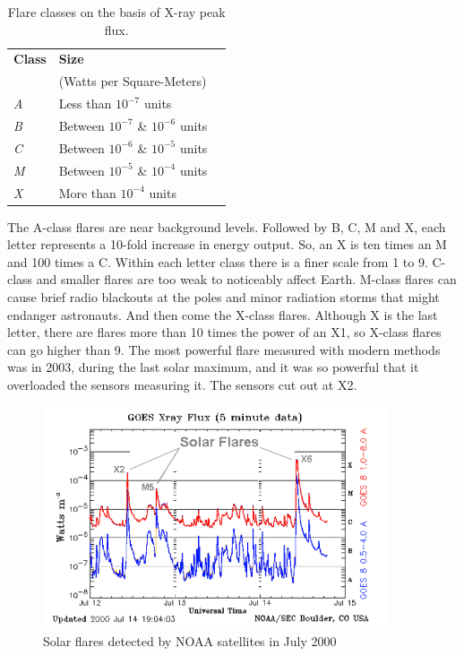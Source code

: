 \documentclass[12pt,twoside]{reedthesis}
\begin{document}
\begin{table}[h]
	\centering 
	\begin{tabular}{lp{5cm}l}
		\hline
		\textbf{Class} &  \textbf{Size} \\ & (Watts per Square-Meters) \\
		\hline
		\textit{A}  		&  Less  than  $10^{-7}$ units \\
		\textit{B}  		&  Between  $10^{-7}$ \& $10 ^{-6}$ units \\
		\textit{C}  		&  Between  $10^{-6}$ \& $10^{-5}$ units \\
		\textit{M}  		&  Between  $10^{-5}$ \& $10^{-4}$ units \\
		\textit{X}  		&  More  than  $10^{-4}$ units \\
		\hline
	\end{tabular}
	\caption{Flare classes on the basis of X-ray peak flux.}
	\end{table}
	
	
	The A-class flares are near background levels. Followed by B, C, M and X, each letter represents a 10-fold increase in energy output. So, an X is ten times an M and 100 times a C. Within each letter class there is a finer scale from 1 to 9. C-class and smaller flares are too weak to noticeably affect Earth. M-class flares can cause brief radio blackouts at the poles and minor radiation storms that might endanger astronauts. And then come the X-class flares. Although X is the last letter, there are flares more than 10 times the power of an X1, so X-class flares can go higher than 9. The most powerful flare measured with modern methods was in 2003, during the last solar maximum, and it was so powerful that it overloaded the sensors measuring it. The sensors cut out at X2.\\
	
	
	\begin{figure}[htbp] %
	   \centering
	   \includegraphics[width=4in]{osf1.png} 
	   \caption{Solar flares detected by NOAA satellites in July 2000}
	\end{figure}
	
\end{document}

